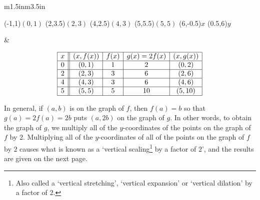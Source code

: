 \begin{center}

\begin{tabular}{m{1.5in}m{3.5in}}

\begin{mfpic}[12]{-1}{6}{-1}{6}
\tlabel[cc](-1,1){\scriptsize $(0,1)$}
\tlabel[cc](2,3.5){\scriptsize $(2,3)$}
\tlabel[cc](4,2.5){\scriptsize $(4,3)$}
\tlabel[cc](5,5.5){\scriptsize $(5,5)$}
\tlabel[cc](6,-0.5){\scriptsize $x$}
\tlabel[cc](0.5,6){\scriptsize $y$}
\axes
{}
\tlpointsep{4pt}
\end{mfpic}
 
&

\[ \begin{array}{|c||c|c|c|c|}  

\hline

 x & (x,f(x)) & f(x) & g(x)=2f(x) & (x, g(x)) \\ \hline
0  & (0,1)& 1 & 2 &(0, 2) \\  \hline
2 & (2,3) & 3 &  6 &(2,6) \\  \hline
4 & (4,3) & 3 &  6 &(4, 6) \\  \hline
5 & (5,5) & 5 &  10 &( 5 ,10) \\  \hline

\end{array} \] 

\end{tabular}

\end{center}

\vspace{-.3in}

In general, if $(a,b)$ is on the graph of $f$, then $f(a) = b$ so that $g(a) = 2 f(a) = 2b$ puts $(a,2b)$ on the graph of $g$.  In other words, to obtain the graph of $g$, we multiply all of the $y$-coordinates of the points on the graph of $f$ by $2$.  Multiplying all of the $y$-coordinates of all of the points on the graph of $f$ by $2$ causes what is known as a `vertical scaling\footnote{Also called a `vertical stretching', `vertical expansion' or `vertical dilation' by a factor of $2$.} by a factor of $2$', and the results are given on the next page. 

